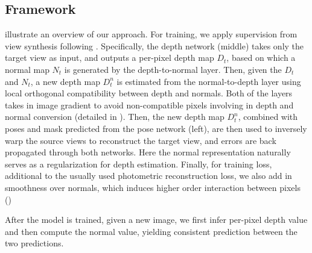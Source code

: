 


\vspace{-0.6\baselineskip}
\subsection{Framework}
\label{sub:framework}
\vspace{-0.3\baselineskip}

 illustrate an overview of our approach. For training, we apply supervision from view synthesis following \cite{zhou2017unsupervised}. Specifically, the depth network (middle) takes only the target view as input, and
outputs a per-pixel depth map $D_t$, based on which a normal map $N_t$ is generated by the depth-to-normal layer. Then, given the $D_t$ and $N_t$, a new depth map $D_t^n$ is estimated from the normal-to-depth layer using local orthogonal compatibility between depth and normals. Both of the layers takes in image gradient to avoid non-compatible pixels involving in depth and normal conversion (detailed in ).
Then, the new depth map $D_t^n$, combined with poses and mask predicted from the pose network (left), are then used to inversely warp the source views to reconstruct the target view, and errors are back propagated through both networks. Here the normal representation naturally serves as a regularization for depth estimation. Finally, for training loss, additional to the usually used photometric reconstruction loss, we also add in smoothness over normals, which induces higher order interaction between pixels ()

After the model is trained, given a new image,  we first infer per-pixel depth value and then compute the normal value, yielding consistent prediction between the two predictions.




